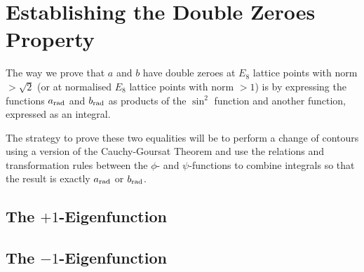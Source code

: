 \section{Establishing the Double Zeroes Property}

The way we prove that $a$ and $b$ have double zeroes at $E_8$ lattice points with norm $> \sqrt{2}$ (or at normalised $E_8$ lattice points with norm $> 1$) is by expressing the functions $a_{\operatorname{rad}}$ and $b_{\operatorname{rad}}$ as products of the $\sin^2$ function and another function, expressed as an integral.

The strategy to prove these two equalities will be to perform a change of contours using a version of the Cauchy-Goursat Theorem and use the relations and transformation rules between the $\phi$- and $\psi$-functions to combine integrals so that the result is exactly $a_{\operatorname{rad}}$ or $b_{\operatorname{rad}}$.



\subsection{The $+1$-Eigenfunction}

\subsection{The $-1$-Eigenfunction}